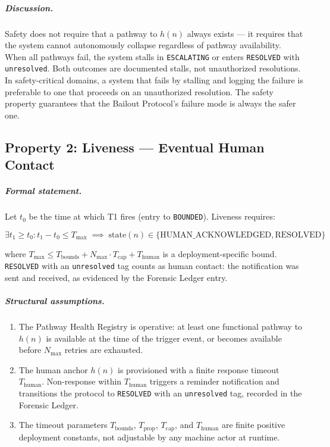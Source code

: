 \subparagraph{Discussion.} Safety does not require that a pathway to $h(n)$ always exists — it requires that the system cannot autonomously collapse regardless of pathway availability. When all pathways fail, the system stalls in \texttt{ESCALATING} or enters \texttt{RESOLVED} with \texttt{unresolved}. Both outcomes are documented stalls, not unauthorized resolutions. In safety-critical domains, a system that fails by stalling and logging the failure is preferable to one that proceeds on an unauthorized resolution. The safety property guarantees that the Bailout Protocol's failure mode is always the safer one.

\subsection{Property 2: Liveness — Eventual Human Contact}


\subparagraph{Formal statement.} Let $t_0$ be the time at which T1 fires (entry to \texttt{BOUNDED}). Liveness requires:

\begin{equation}
\exists t_1 \geq t_0 : t_1 - t_0 \leq T_{\max}
\;\implies\;
\text{state}(n) \in \{\text{HUMAN\_ACKNOWLEDGED}, \text{RESOLVED}\}
\end{equation}

where $T_{\max} \leq T_{\text{bounds}} + N_{\max} \cdot T_{\text{cap}} + T_{\text{human}}$ is a deployment-specific bound. \texttt{RESOLVED} with an \texttt{unresolved} tag counts as human contact: the notification was sent and received, as evidenced by the Forensic Ledger entry.

\subparagraph{Structural assumptions.}
\begin{enumerate}
\item[\textbf{A2.1}] The Pathway Health Registry is operative: at least one functional pathway to $h(n)$ is available at the time of the trigger event, or becomes available before $N_{\max}$ retries are exhausted.
\item[\textbf{A2.2}] The human anchor $h(n)$ is provisioned with a finite response timeout $T_{\text{human}}$. Non-response within $T_{\text{human}}$ triggers a reminder notification and transitions the protocol to \texttt{RESOLVED} with an \texttt{unresolved} tag, recorded in the Forensic Ledger.
\item[\textbf{A2.3}] The timeout parameters $T_{\text{bounds}}$, $T_{\text{prop}}$, $T_{\text{cap}}$, and $T_{\text{human}}$ are finite positive deployment constants, not adjustable by any machine actor at runtime.
\end{enumerate}

